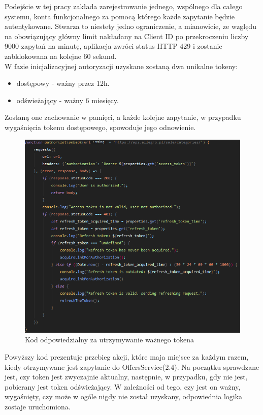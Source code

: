 Podejście w tej pracy zakłada zarejestrowanie jednego, wspólnego dla całego systemu, konta funkcjonalnego za pomocą którego każde zapytanie będzie autentykowane. Stwarza to niestety jedno ograniczenie, a mianowicie, ze względu na obowiązujący główny limit nakładany na Client ID po przekroczeniu liczby 9000 zapytań na minutę, aplikacja zwróci status HTTP 429 i zostanie zabklokowana na kolejne 60 sekund.\\
W fazie inicjalizacyjnej autoryzacji uzyskane zostaną dwa unikalne tokeny: 
\begin{itemize}
	\item dostępowy - ważny przez 12h.
	\item odświeżający - ważny 6 miesięcy.
\end{itemize}
Zostaną one zachowanie w pamięci, a każde kolejne zapytanie, w przypadku wygaśnięcia tokenu dostępowego, spowoduje jego odnowienie.
\begin{figure}[H]
	\centering
	\includegraphics[width=\linewidth]{authorization.png}
	\caption{Kod odpowiedzialny za utrzymywanie ważnego tokena}
\end{figure}
Powyższy kod prezentuje przebieg akcji, które maja miejsce za każdym razem, kiedy otrzymywane jest zapytanie do OffersService(2.4). Na początku sprawdzane jest, czy token jest zwyczajnie aktualny, następnie, w przypadku, gdy nie jest, pobierany jest token odświeżający. W zależności od tego, czy jest on ważny, wygaśnięty, czy może w ogóle nigdy nie został uzyskany, odpowiednia logika zostaje uruchomiona.

